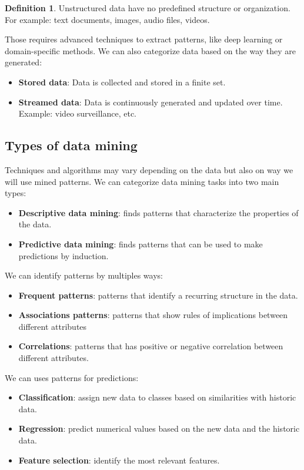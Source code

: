 \documentclass[12pt, openany]{report}
\theoremstyle{definition}
\newtheorem{definition}[thm]{Definition}
\begin{document}
\begin{definition}
    Unstructured data have no predefined structure or organization. For example: text documents, images, audio files, videos.
\end{definition}
Those requires advanced techniques to extract patterns, like deep learning or domain-specific methods.
We can also categorize data based on the way they are generated:
\begin{itemize}
    \item \textbf{Stored data}: Data is collected and stored in a finite set.
    \item \textbf{Streamed data}: Data is continuously generated and updated over time. Example: video surveillance, etc.
\end{itemize}
\subsection{Types of data mining}
Techniques and algorithms may vary depending on the data but also on way we will use mined patterns. We can categorize data mining tasks into two main types:
\begin{itemize}
    \item \textbf{Descriptive data mining}: finds patterns that characterize the properties of the data. 
    \item \textbf{Predictive data mining}: finds patterns that can be used to make predictions by induction.
\end{itemize}
We can identify patterns by multiples ways:
\begin{itemize}
    \item \textbf{Frequent patterns}: patterns that identify a recurring structure in the data.
    \item \textbf{Associations patterns}: patterns that show rules of implications between different attributes
    \item \textbf{Correlations}: patterns that has positive or negative correlation between different attributes.
\end{itemize}
We can uses patterns for predictions:
\begin{itemize}
    \item \textbf{Classification}: assign new data to classes based on similarities with historic data.
    \item \textbf{Regression}: predict numerical values based on the new data and the historic data.
    \item \textbf{Feature selection}: identify the most relevant features.
\end{itemize}
\end{document}
